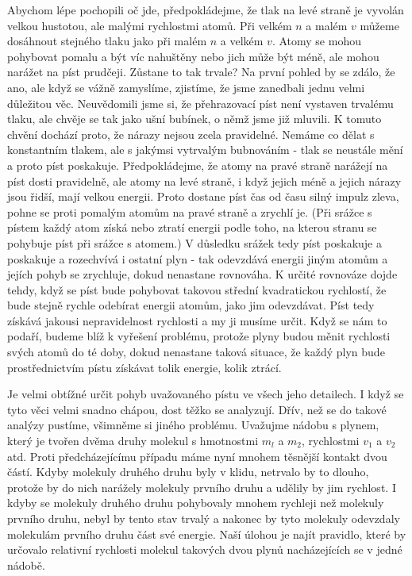     Abychom lépe pochopili oč jde, předpokládejme, že tlak na levé straně je vyvolán velkou
    hustotou, ale malými rychlostmi atomů. Při velkém \(n\) a malém \(v\) můžeme dosáhnout stejného
    tlaku jako při malém \(n\) a velkém \(v\). Atomy se mohou pohybovat pomalu a být víc nahuštěny
    nebo jich může být méně, ale mohou narážet na píst prudčeji. Zůstane to tak trvale? Na první
    pohled by se zdálo, že ano, ale když se vážně zamyslíme, zjistíme, že jsme zanedbali jednu velmi
    důležitou věc. Neuvědomili jsme si, že přehrazovací píst není vystaven trvalému tlaku, ale
    chvěje se tak jako ušní bubínek, o němž jsme již mluvili. K tomuto chvění dochází proto, že
    nárazy nejsou zcela pravidelné. Nemáme co dělat s konstantním tlakem, ale s jakýmsi vytrvalým
    bubnováním - tlak se neustále mění a proto píst poskakuje. Předpokládejme, že atomy na pravé
    straně narážejí na píst dosti pravidelně, ale atomy na levé straně, i když jejich méně a jejich
    nárazy jsou řidší, mají velkou energii. Proto dostane píst čas od času silný impulz zleva, pohne
    se proti pomalým atomům na pravé straně a zrychlí je. (Při srážce s pístem každý atom získá nebo
    ztratí energii podle toho, na kterou stranu se pohybuje píst při srážce s atomem.) V důsledku
    srážek tedy píst poskakuje a poskakuje a rozechvívá i ostatní plyn - tak odevzdává energii jiným
    atomům a jejích pohyb se zrychluje, dokud nenastane rovnováha. K určité rovnováze dojde tehdy,
    když se píst bude pohybovat takovou střední kvadratickou rychlostí, že bude stejně rychle
    odebírat energii atomům, jako jim odevzdávat. Píst tedy získává jakousi nepravidelnost rychlosti
    a my ji musíme určit. Když se nám to podaří, budeme blíž k vyřešení problému, protože plyny
    budou měnit rychlosti svých atomů do té doby, dokud nenastane taková situace, že každý plyn bude
    prostřednictvím pístu získávat tolik energie, kolik ztrácí.
    
    Je velmi obtížné určit pohyb uvažovaného pístu ve všech jeho detailech. I když se tyto věci
    velmi snadno chápou, dost těžko se analyzují. Dřív, než se do takové analýzy pustíme, všimněme
    si jiného problému. Uvažujme nádobu s plynem, který je tvořen dvěma druhy molekul s hmotnostmi
    \(m_l\) a \(m_2\), rychlostmi \(v_1\) a \(v_2\) atd. Proti předcházejícímu případu máme nyní
    mnohem těsnější kontakt dvou částí. Kdyby molekuly druhého druhu byly v klidu, netrvalo by to
    dlouho, protože by do nich narážely molekuly prvního druhu a udělily by jim rychlost. I kdyby se
    molekuly druhého druhu pohybovaly mnohem rychleji než molekuly prvního druhu, nebyl by tento
    stav trvalý a nakonec by tyto molekuly odevzdaly molekulám prvního druhu část své energie. Naší
    úlohou je najít pravidlo, které by určovalo relativní rychlosti molekul takových dvou plynů
    nacházejících se v jedné nádobě.
    
